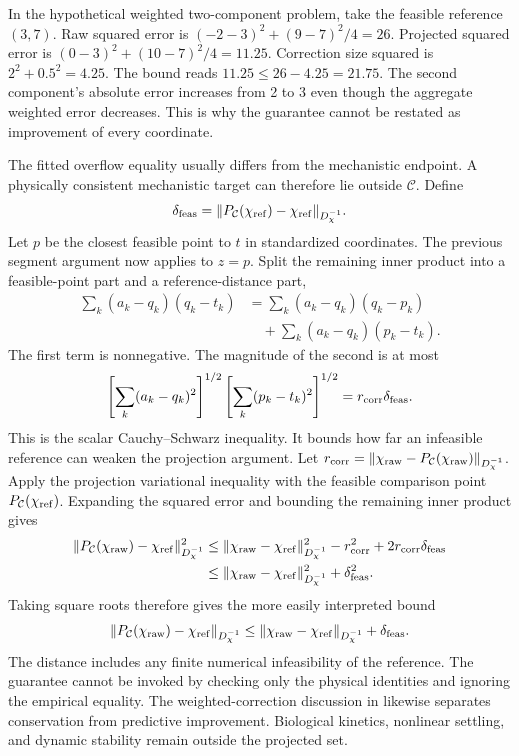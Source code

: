 In the hypothetical weighted two-component problem, take the feasible reference $(3,7)$. Raw squared error is $(-2-3)^2+(9-7)^2/4=26$. Projected squared error is $(0-3)^2+(10-7)^2/4=11.25$. Correction size squared is $2^2+0.5^2=4.25$. The bound reads $11.25\le26-4.25=21.75$. The second component's absolute error increases from 2 to 3 even though the aggregate weighted error decreases. This is why the guarantee cannot be restated as improvement of every coordinate.

The fitted overflow equality usually differs from the mechanistic endpoint. A physically consistent mechanistic target can therefore lie outside $\mathcal C$. Define
\begin{equation}
\delta_{\rm feas}=\|P_{\mathcal C}(\chi_{\rm ref})-\chi_{\rm ref}\|_{D_\chi^{-1}}.
\end{equation}
Let $p$ be the closest feasible point to $t$ in standardized coordinates. The previous segment argument now applies to $z=p$. Split the remaining inner product into a feasible-point part and a reference-distance part,
\begin{align}
\sum_k(a_k-q_k)(q_k-t_k)
&=\sum_k(a_k-q_k)(q_k-p_k)\\
&\quad+\sum_k(a_k-q_k)(p_k-t_k).
\end{align}
The first term is nonnegative. The magnitude of the second is at most
\begin{equation}
\left[\sum_k(a_k-q_k)^2\right]^{1/2}
\left[\sum_k(p_k-t_k)^2\right]^{1/2}
=r_{\rm corr}\delta_{\rm feas}.
\end{equation}
This is the scalar Cauchy--Schwarz inequality. It bounds how far an infeasible reference can weaken the projection argument. Let $r_{\rm corr}=\|\chi_{\rm raw}-P_{\mathcal C}(\chi_{\rm raw})\|_{D_\chi^{-1}}$. Apply the projection variational inequality with the feasible comparison point $P_{\mathcal C}(\chi_{\rm ref})$. Expanding the squared error and bounding the remaining inner product gives
\begin{align}
\|P_{\mathcal C}(\chi_{\rm raw})-\chi_{\rm ref}\|_{D_\chi^{-1}}^2
&\le\|\chi_{\rm raw}-\chi_{\rm ref}\|_{D_\chi^{-1}}^2
-r_{\rm corr}^2+2r_{\rm corr}\delta_{\rm feas}\\
&\le\|\chi_{\rm raw}-\chi_{\rm ref}\|_{D_\chi^{-1}}^2+\delta_{\rm feas}^2.
\end{align}
Taking square roots therefore gives the more easily interpreted bound
\begin{equation}
\|P_{\mathcal C}(\chi_{\rm raw})-\chi_{\rm ref}\|_{D_\chi^{-1}}
\le\|\chi_{\rm raw}-\chi_{\rm ref}\|_{D_\chi^{-1}}+\delta_{\rm feas}.
\label{eq:plant_projection_error_general}
\end{equation}
The distance includes any finite numerical infeasibility of the reference. The guarantee cannot be invoked by checking only the physical identities and ignoring the empirical equality. The weighted-correction discussion in \citet{SturmSilva2024} likewise separates conservation from predictive improvement. Biological kinetics, nonlinear settling, and dynamic stability remain outside the projected set.

